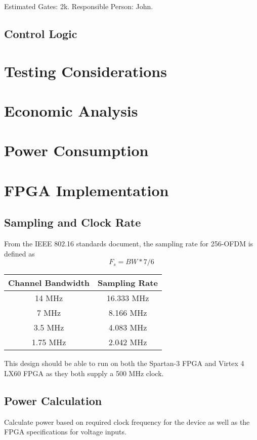 \documentclass[10pt]{article}
\begin{document}
	Estimated Gates: 2k.
	Responsible Person: John.

	\subsection{Control Logic}
	\label{sec:ctrl}

\section{Testing Considerations}
\section{Economic Analysis}
\section{Power Consumption}
\section{FPGA Implementation}
  \subsection{Sampling and Clock Rate}
    From the IEEE 802.16 standards document, the sampling rate for 256-OFDM is defined as
    \begin{equation}
    F_s = BW * 7/6
    \end{equation}
  
  \begin{center}
  \begin{tabular}{c|c}
  Channel Bandwidth & Sampling Rate \\ \hline
  14 MHz & 16.333 MHz \\
  7 MHz & 8.166 MHz \\
  3.5 MHz & 4.083 MHz \\
  1.75 MHz & 2.042 MHz \\ \hline
  \end{tabular}
  \end{center}
  
  This design should be able to run on both the Spartan-3 FPGA and Virtex 4 LX60
  FPGA as they both supply a 500 MHz clock.
  
  \subsection{Power Calculation}
  
  Calculate power based on required clock frequency for the device as well as the
  FPGA specifications for voltage inputs.
  
\end{document}
